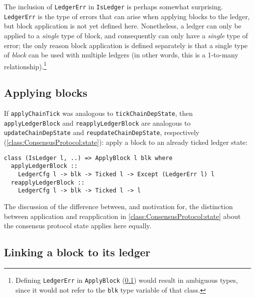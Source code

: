 The inclusion of \lstinline!LedgerErr! in \lstinline!IsLedger! is perhaps
somewhat surprising. \lstinline!LedgerErr! is the type of errors that can arise
when applying blocks to the ledger, but block application is not yet defined
here. Nonetheless, a ledger can only be applied to a \emph{single} type of
block, and consequently can only have a \emph{single} type of error; the only
reason block application is defined separately is that a single type of
\emph{block} can be used with multiple ledgers (in other words, this is a
1-to-many relationship).\footnote{Defining \lstinline!LedgerErr! in
\lstinline!ApplyBlock! (\cref{ledger:api:ApplyBlock}) would result in ambiguous
types, since it would not refer to the \lstinline!blk! type variable of that
class.}

\subsection{Applying blocks}
\label{ledger:api:ApplyBlock}

If \lstinline!applyChainTick! was analogous to \lstinline!tickChainDepState!,
then \lstinline!applyLedgerBlock! and \lstinline!reapplyLedgerBlock! are
analogous to \lstinline!updateChainDepState! and
\lstinline!reupdateChainDepState!, respectively
(\cref{class:ConsensusProtocol:state}): apply a block to an already ticked
ledger state:
%
\begin{lstlisting}
class (IsLedger l, ..) => ApplyBlock l blk where
  applyLedgerBlock ::
    LedgerCfg l -> blk -> Ticked l -> Except (LedgerErr l) l
  reapplyLedgerBlock ::
    LedgerCfg l -> blk -> Ticked l -> l
\end{lstlisting}
%
The discussion of the difference between, and motivation for, the distinction
between application and reapplication in \cref{class:ConsensusProtocol:state}
about the consensus protocol state applies here equally.

\subsection{Linking a block to its ledger}

